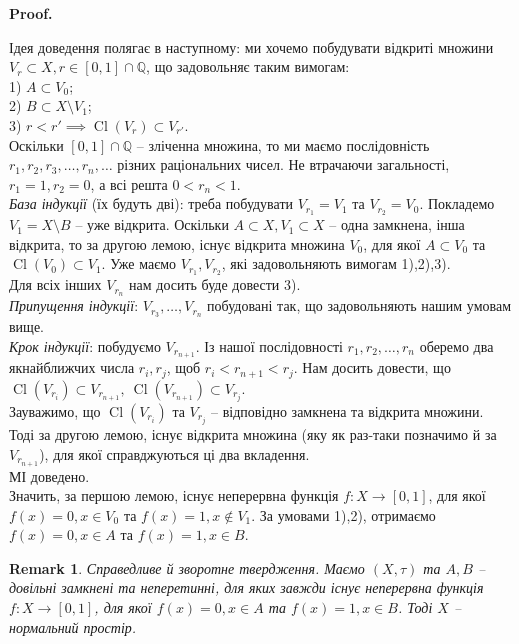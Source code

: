 \documentclass[a4paper, 10pt]{article}
\makeatletter
\theoremstyle{theoremdd}
\newtheorem{remark}[theorem]{Remark}
\DeclareMathOperator{\Cl}{Cl}
\renewenvironment{proof}[1][Proof.\\]{\par
\pushQED{\hfill \qed}%
\normalfont \topsep6\p@\@plus6\p@\relax
\trivlist
\item\relax
{\bfseries
#1\@addpunct{.}}\hspace\labelsep\ignorespaces
}{%
\popQED\endtrivlist\@endpefalse
}
\makeatother
\begin{document}
\begin{proof}
Ідея доведення полягає в наступному: ми хочемо побудувати відкриті множини $V_r \subset X, r \in [0,1] \cap \mathbb{Q}$, що задовольняє таким вимогам:\\
1) $A \subset V_0$;\\
2) $B \subset X \setminus V_1$;\\
3) $r < r' \implies \Cl(V_r) \subset V_{r'}$.\\
Оскільки $[0,1] \cap \mathbb{Q}$ -- зліченна множина, то ми маємо послідовність $r_1,r_2,r_3,\dots,r_n,\dots$ різних раціональних чисел. Не втрачаючи загальності, $r_1 = 1, r_2 = 0$, а всі решта $0 < r_n < 1$.\\
\textit{База індукції} (їх будуть дві): треба побудувати $V_{r_1} = V_1$ та $V_{r_2} = V_0$. Покладемо $V_1 = X \setminus B$ -- уже відкрита. Оскільки $A \subset X, V_1 \subset X$ -- одна замкнена, інша відкрита, то за другою лемою, існує відкрита множина $V_0$, для якої $A \subset V_0$ та $\Cl(V_0) \subset V_1$. Уже маємо $V_{r_1},V_{r_2}$, які задовольняють вимогам 1),2),3).\\
Для всіх інших $V_{r_n}$ нам досить буде довести 3).\\
\textit{Припущення індукції}: $V_{r_3},\dots,V_{r_n}$ побудовані так, що задовольняють нашим умовам вище.\\
\textit{Крок індукції}: побудуємо $V_{r_{n+1}}$. Із нашої послідовності $r_1,r_2,\dots,r_n$ оберемо два якнайближчих числа $r_i,r_j$, щоб $r_i < r_{n+1} < r_j$. Нам досить довести, що $\Cl(V_{r_i}) \subset V_{r_{n+1}},\ \Cl(V_{r_{n+1}}) \subset V_{r_j}$.\\
Зауважимо, що $\Cl(V_{r_i})$ та $V_{r_j}$ -- відповідно замкнена та відкрита множини. Тоді за другою лемою, існує відкрита множина (яку як раз-таки позначимо й за $V_{r_{n+1}}$), для якої справджуються ці два вкладення. \\
МІ доведено.\\
Значить, за першою лемою, існує неперервна функція $f \colon X \to [0,1]$, для якої $f(x) = 0, x \in V_0$ та $f(x) = 1, x \notin V_1$. За умовами 1),2), отримаємо $f(x) = 0, x \in A$ та $f(x) = 1, x \in B$.
\end{proof}

\begin{remark}
Справедливе й зворотне твердження. Маємо $(X,\tau)$ та $A,B$ -- довільні замкнені та неперетинні, для яких завжди існує неперервна функція $f \colon X \to [0,1]$, для якої $f(x) = 0, x \in A$ та $f(x) = 1, x \in B$. Тоді $X$ -- нормальний простір.
\end{remark}
\end{document}
